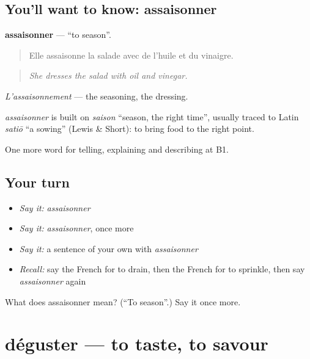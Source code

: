 \subsection*{You'll want to know: assaisonner}
\textbf{assaisonner} — \textquotedblleft{}to season\textquotedblright{}.

\begin{quote}
Elle assaisonne la salade avec de l'huile et du vinaigre.
\end{quote}

\begin{quote}
\emph{She dresses the salad with oil and vinegar.}
\end{quote}

\emph{L'assaisonnement} — the seasoning, the dressing.

\begin{cousinweb}
\emph{assaisonner} is built on \emph{saison} \textquotedblleft{}season, the right time\textquotedblright{}, usually traced to Latin \emph{satiō} \textquotedblleft{}a sowing\textquotedblright{} (Lewis \& Short): to bring food to the right point.
\end{cousinweb}

\begin{grammarlens}[title={What you've built}]
One more word for telling, explaining and describing at B1.
\end{grammarlens}

\subsection*{Your turn}
\begin{itemize}
\raggedright
  \item \emph{Say it:} \emph{assaisonner}
  \item \emph{Say it:} \emph{assaisonner}, once more
  \item \emph{Say it:} a sentence of your own with \emph{assaisonner}
  \item \emph{Recall:} say the French for to drain, then the French for to sprinkle, then say \emph{assaisonner} again
\end{itemize}

\begin{tcolorbox}[breakable,colback=teal!4,colframe=teal!35!black,title={Before you move on}]
What does assaisonner mean? (\textquotedblleft{}To season\textquotedblright{}.) Say it once more.
\end{tcolorbox}
\section[déguster]{déguster — to taste, to savour}

